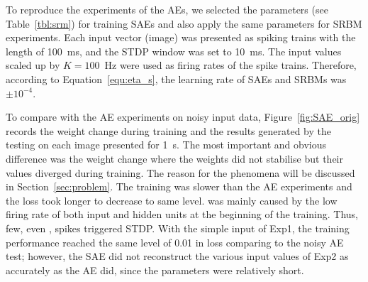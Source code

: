 To reproduce the experiments of the AEs, we selected the parameters (see Table~\ref{tbl:srm}) for training SAEs and also apply the same parameters for SRBM experiments.
Each input vector (image) was presented as spiking trains with the length of 100~ms, and the STDP window was set to 10~ms.
The input values scaled up by $K=100$~Hz were used as firing rates of the spike trains.
Therefore, according to Equation~\ref{equ:eta_s}, the learning rate of SAEs and SRBMs was $\pm 10^{-4}$.

To compare with the AE experiments on noisy input data, Figure~\ref{fig:SAE_orig} records the weight change during training and the results generated by the testing on each image presented for 1~s.
The most important and obvious difference was the weight change where the weights did not stabilise but their values diverged during training.
The reason for the phenomena will be discussed in Section~\ref{sec:problem}.
The training was slower than the AE experiments and the loss took longer \DIFdelbegin {}\DIFdelend to decrease to \DIFdelbegin {}\DIFdelend \DIFaddbegin {}\DIFaddend same level.
\DIFdelbegin {}\DIFdelend \DIFaddbegin {}\DIFaddend was mainly caused by the low firing rate of both input and hidden units at the beginning of the training.
Thus, few, even \DIFdelbegin {}\DIFdelend \DIFaddbegin {}\DIFaddend , spikes triggered STDP.
With the simple input of Exp1, the training performance reached the same level of 0.01 in loss comparing to the noisy AE test;
however, the SAE did not reconstruct the various input values of Exp2 as accurately as the AE did, since the parameters \DIFdelbegin {}\DIFdelend \DIFaddbegin {}\DIFaddend were relatively short.

